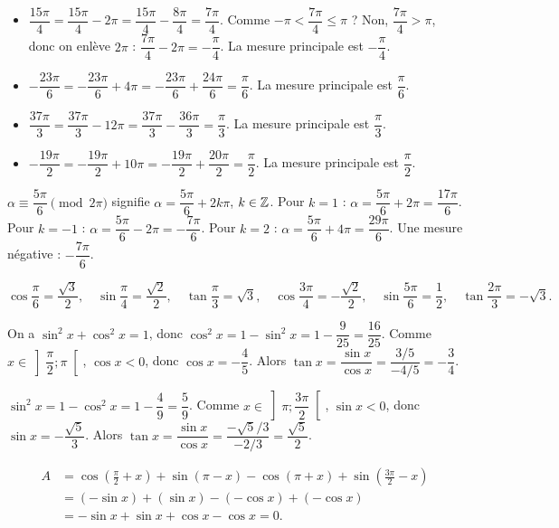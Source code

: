 \begin{itemize}
\item $\dfrac{15\pi}{4} = \dfrac{15\pi}{4} - 2\pi = \dfrac{15\pi}{4} - \dfrac{8\pi}{4} = \dfrac{7\pi}{4}$. Comme $-\pi < \dfrac{7\pi}{4} \le \pi$ ? Non, $\dfrac{7\pi}{4} > \pi$, donc on enlève $2\pi$ : $\dfrac{7\pi}{4} - 2\pi = -\dfrac{\pi}{4}$. La mesure principale est $-\dfrac{\pi}{4}$.
\item $-\dfrac{23\pi}{6} = -\dfrac{23\pi}{6} + 4\pi = -\dfrac{23\pi}{6} + \dfrac{24\pi}{6} = \dfrac{\pi}{6}$. La mesure principale est $\dfrac{\pi}{6}$.
\item $\dfrac{37\pi}{3} = \dfrac{37\pi}{3} - 12\pi = \dfrac{37\pi}{3} - \dfrac{36\pi}{3} = \dfrac{\pi}{3}$. La mesure principale est $\dfrac{\pi}{3}$.
\item $-\dfrac{19\pi}{2} = -\dfrac{19\pi}{2} + 10\pi = -\dfrac{19\pi}{2} + \dfrac{20\pi}{2} = \dfrac{\pi}{2}$. La mesure principale est $\dfrac{\pi}{2}$.
\end{itemize}

$\alpha \equiv \dfrac{5\pi}{6} \pmod{2\pi}$ signifie $\alpha = \dfrac{5\pi}{6} + 2k\pi$, $k\in\mathbb{Z}$.
Pour $k=1$ : $\alpha = \dfrac{5\pi}{6}+2\pi = \dfrac{17\pi}{6}$.
Pour $k=-1$ : $\alpha = \dfrac{5\pi}{6}-2\pi = -\dfrac{7\pi}{6}$.
Pour $k=2$ : $\alpha = \dfrac{5\pi}{6}+4\pi = \dfrac{29\pi}{6}$.
Une mesure négative : $-\dfrac{7\pi}{6}$.

\[
\cos\frac{\pi}{6}=\frac{\sqrt{3}}{2},\quad \sin\frac{\pi}{4}=\frac{\sqrt{2}}{2},\quad \tan\frac{\pi}{3}=\sqrt{3},\quad \cos\frac{3\pi}{4}=-\frac{\sqrt{2}}{2},\quad \sin\frac{5\pi}{6}=\frac{1}{2},\quad \tan\frac{2\pi}{3}=-\sqrt{3}.
\]

On a $\sin^2 x + \cos^2 x = 1$, donc $\cos^2 x = 1 - \sin^2 x = 1 - \dfrac{9}{25} = \dfrac{16}{25}$.
Comme $x \in \left]\dfrac{\pi}{2};\pi\right[$, $\cos x < 0$, donc $\cos x = -\dfrac{4}{5}$.
Alors $\tan x = \dfrac{\sin x}{\cos x} = \dfrac{3/5}{-4/5} = -\dfrac{3}{4}$.

$\sin^2 x = 1 - \cos^2 x = 1 - \dfrac{4}{9} = \dfrac{5}{9}$.
Comme $x \in \left]\pi;\dfrac{3\pi}{2}\right[$, $\sin x < 0$, donc $\sin x = -\dfrac{\sqrt{5}}{3}$.
Alors $\tan x = \dfrac{\sin x}{\cos x} = \dfrac{-\sqrt{5}/3}{-2/3} = \dfrac{\sqrt{5}}{2}$.

\[
\begin{aligned}
A &= \cos\left(\frac{\pi}{2}+x\right) + \sin(\pi-x) - \cos(\pi+x) + \sin\left(\frac{3\pi}{2}-x\right) \\
&= (-\sin x) + (\sin x) - (-\cos x) + (-\cos x) \\
&= -\sin x + \sin x + \cos x - \cos x = 0.
\end{aligned}
\]

